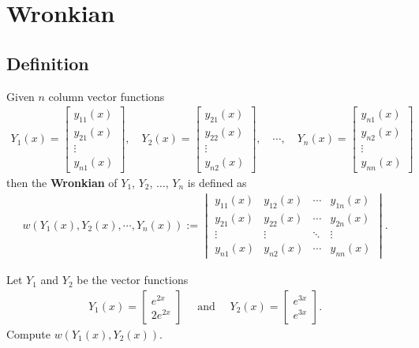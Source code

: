 \documentclass[12pt,a4paper]{article}
\newcounter{example}[section]
\begin{document}
	
	\newpage
	
	\section{Wronkian}
	
	\subsection{Definition}
	Given $n$ column vector functions
		\begin{align*}
		Y_1 (x) = \begin{bmatrix}
		y_{11} (x) \\ y_{21} (x) \\ \vdots \\ y_{n1} (x)
		\end{bmatrix} , \quad Y_2 (x) = \begin{bmatrix}
		y_{21} (x) \\ y_{22} (x) \\ \vdots \\ y_{n2} (x)
		\end{bmatrix} , \quad \cdots , \quad
		Y_n (x) = \begin{bmatrix}
		y_{n1} (x) \\ y_{n2} (x) \\ \vdots \\ y_{nn} (x)
		\end{bmatrix}
		\end{align*}
	then the \textbf{Wronkian} of $Y_1$, $Y_2$, $\ldots$, $Y_n$ is defined as
		\begin{align*}
		w (Y_1 (x), Y_2 (x), \cdots , Y_n (x)) := \begin{vmatrix}
		y_{11} (x) & y_{12} (x) & \cdots & y_{1n} (x) \\
		y_{21} (x) & y_{22} (x) & \cdots & y_{2n} (x) \\
		\vdots & \vdots & \ddots & \vdots \\
		y_{n1} (x) & y_{n2} (x) & \cdots & y_{nn} (x) 
		\end{vmatrix} .
		\end{align*}
		
	\begin{example}\label{Ex:WronkianCalc}
	Let $Y_1$ and $Y_2$ be the vector functions
		\begin{align*}
		Y_1 (x) = \begin{bmatrix}
		e^{2x} \\ 2e^{2x}
		\end{bmatrix} \quad \text{ and } \quad
		Y_2 (x) = \begin{bmatrix}
		e^{3x} \\ e^{3x}
		\end{bmatrix} .
		\end{align*}
	Compute $w (Y_1 (x), Y_2 (x))$.
	\end{example}
	
\end{document}
